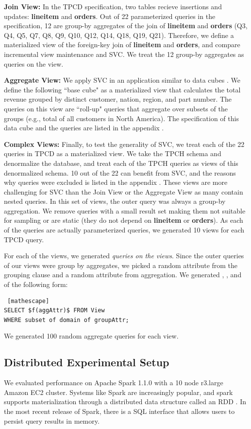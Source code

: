 \textbf{Join View: } In the TPCD specification, two tables recieve insertions and updates: \textbf{lineitem} and \textbf{orders}.
Out of 22 parameterized queries in the specification, 12 are group-by aggregates of the join of \textbf{lineitem} and \textbf{orders} (Q3, Q4, Q5, Q7, Q8, Q9, Q10, Q12, Q14, Q18, Q19, Q21).
Therefore, we define a materialized view of the foreign-key join of \textbf{lineitem} and \textbf{orders}, and compare incremental view maintenance and SVC.
We treat the 12 group-by aggregates as queries on the view.

\textbf{Aggregate View: } We apply SVC in an application similar to data cubes \cite{gray1997data}.
We define the following ``base cube" as a materialized view that calculates the total revenue 
grouped by distinct customer, nation, region, and part number.
The queries on this view are ``roll-up" queries that aggregate over 
subsets of the groups (e.g., total of all customers in North America).
The specification of this data cube and the queries are listed in the appendix .

\textbf{Complex Views:} Finally, to test the generality of SVC, we treat each of the 22 queries in TPCD as a materialized view.
We take the TPCH schema and denormalize the database, and treat each of the TPCH queries as views of this denormalized schema. 
10 out of the 22 can benefit from SVC, and the reasons why queries were excluded is listed in the appendix .
These views are more challenging for SVC than the Join View or the Aggregate View as many contain nested queries.
In this set of views, the outer query was always a group-by aggregation.
We remove queries with a small result set making them not suitable for sampling or are static (they do not depend on \textbf{lineitem} or \textbf{orders}). 
As each of the queries are actually parameterized queries, we generated 10 views for each TPCD query.

For each of the views, we generated \emph{queries on the views}.
Since the outer queries of our views were group by aggregates, we picked a random attribute from the grouping clause and a random attribute from aggregation.
We generated \sumfunc, \avgfunc, and \countfunc of the following form:
\begin{lstlisting} [mathescape]
SELECT $f(aggAttr)$ FROM View 
WHERE subset of domain of groupAttr;
\end{lstlisting}
We generated 100 random aggregate queries for each view.

\subsection{Distributed Experimental Setup}
We evaluated performance on Apache Spark 1.1.0 with a 10 node r3.large Amazon EC2 cluster.
Systems like Spark are increasingly popular, and spark supports materialization through a distributed data structure called an RDD \cite{zaharia2012resilient}.
In the most recent release of Spark, there is a SQL interface that allows users to persist query results in memory.

